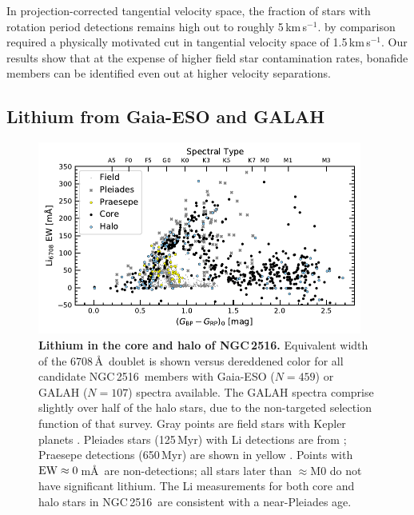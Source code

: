 \documentclass[12pt,twocolumn,tighten]{aastex63}
\newcommand{\cn}{NGC\,2516} %
\newcommand{\kms}{\,km\,s$^{-1}$}
\begin{document}
In projection-corrected tangential velocity space, the fraction of
stars with rotation period detections remains high out to roughly
5\kms.  \citet{meingast_2021} by comparison required a physically
motivated cut in tangential velocity space of 1.5\kms.  Our results
show that at the expense of higher field star contamination rates,
bonafide members can be identified even out at higher velocity
separations.


\subsection{Lithium from Gaia-ESO and GALAH}
\label{subsec:lithium}

\begin{figure}[t]
	\begin{center}
		\leavevmode
			\includegraphics[width=0.95\textwidth]{f7.pdf}
	\end{center}
	\vspace{-0.700cm}
  \caption{ {\bf Lithium in the core and halo of NGC\,2516.}
  Equivalent width of the 6708\,\AA\ doublet is shown versus
  dereddened color for all candidate \cn\ members with Gaia-ESO
  ($N=459$) or GALAH ($N=107$) spectra available.  The GALAH spectra
  comprise slightly over half of the halo stars, due to the
  non-targeted selection function of that survey.  Gray
  points are field stars with Kepler planets
  \citep{berger_identifying_2018}.  Pleiades stars (125\,Myr)
  with Li detections are from \citet{bouvier_pleiades_lirot_2018};
  Praesepe detections (650\,Myr) are shown in yellow
  \citep{soderblom_praesepe_1993}.  Points with ${\rm
  EW}\approx0\,$m\AA\ are non-detections; all stars 
  later than $\approx$M0 do not have significant lithium.
  The Li measurements for both core and halo stars in \cn\ are
  consistent with a near-Pleiades age.
  \label{fig:lithiumcorehalo}
  }
\end{figure}
\end{document}
